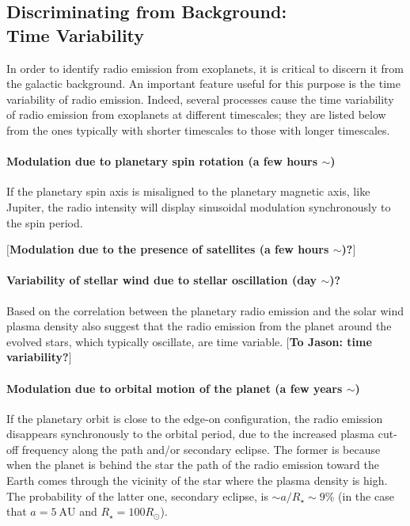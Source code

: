 \documentclass{emulateapj}
\def\memoYF#1{\color{red}$[${\bf #1}$]$ \color{black}}
\begin{document}
%
%
% 


\subsection{Discriminating from Background:\\Time Variability}
\label{ss:timevariability}


In order to identify radio emission from exoplanets, it is critical to discern it from the galactic background. 
An important feature useful for this purpose is the time variability of radio emission. 
Indeed, several processes cause the time variability of radio emission from exoplanets at different timescales; they are listed below from the ones typically with shorter timescales to those with longer timescales. 

\paragraph{Modulation due to planetary spin rotation (a few hours $\sim $)} 
If the planetary spin axis is misaligned to the planetary magnetic axis, like Jupiter, the radio intensity  will display sinusoidal modulation synchronously to the spin period. 
%

\memoYF{Modulation due to the presence of satellites (a few hours $\sim $)?} 
%

\paragraph{Variability of stellar wind due to stellar oscillation (day $\sim $)?}
Based on the correlation between the planetary radio emission and the solar wind plasma density also suggest that the radio emission from the planet around the evolved stars, which typically oscillate, are time variable. \memoYF{To Jason: time variability?}
%
\paragraph{Modulation due to orbital motion of the planet (a few years $\sim $)}
If the planetary orbit is close to the edge-on configuration, the radio emission disappears synchronously to the orbital period, due to the increased plasma cut-off frequency along the path and/or secondary eclipse. The former is because when the planet is behind the star the path of the radio emission toward the Earth comes through the vicinity of the star where the plasma density is high. The probability of the latter one, secondary eclipse, is $\sim a/R_\star \sim 9$\% (in the case that $a=5~\mathrm{AU}$ and $R_{\star}=100R_{\odot }$). 
%
\end{document}
